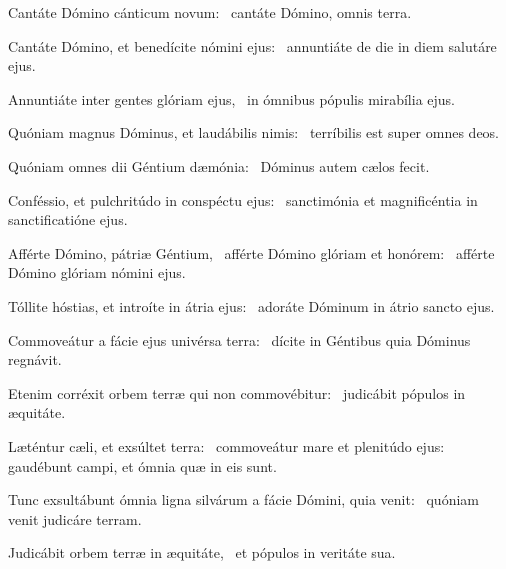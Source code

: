 \item Cantáte Dómino cánticum novum:~\psstar{} cantáte Dómino, omnis terra.

\item Cantáte Dómino, et benedícite nómini ejus:~\psstar{} annuntiáte de die in diem salutáre ejus.

\item Annuntiáte inter gentes glóriam ejus,~\psstar{} in ómnibus pópulis mirabília ejus.

\item Quóniam magnus Dóminus, et laudábilis nimis:~\psstar{} terríbilis est super omnes deos.

\item Quóniam omnes dii Géntium dæmónia:~\psstar{} Dóminus autem cælos fecit.

\item Conféssio, et pulchritúdo in conspéctu ejus:~\psstar{} sanctimónia et magnificéntia in sanctificatióne ejus.

\item Afférte Dómino, pátriæ Géntium,~\pscross{} afférte Dómino glóriam et honórem:~\psstar{} afférte Dómino glóriam nómini ejus.

\item Tóllite hóstias, et introíte in átria ejus:~\psstar{} adoráte Dóminum in átrio sancto ejus.

\item Commoveátur a fácie ejus univérsa terra:~\psstar{} dícite in Géntibus quia Dóminus regnávit.

\item Etenim corréxit orbem terræ qui non commovébitur:~\psstar{} judicábit pópulos in æquitáte.

\item Læténtur cæli, et exsúltet terra:~\pscross{} commoveátur mare et plenitúdo ejus:~\psstar{} gaudébunt campi, et ómnia quæ in eis sunt.

\item Tunc exsultábunt ómnia ligna silvárum a fácie Dómini, quia venit:~\psstar{} quóniam venit judicáre terram.

\item Judicábit orbem terræ in æquitáte,~\psstar{} et pópulos in veritáte sua.
